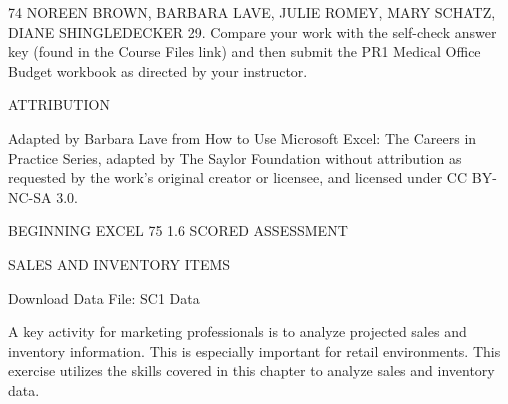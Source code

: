 74 NOREEN BROWN, BARBARA LAVE, JULIE ROMEY, MARY SCHATZ, DIANE SHINGLEDECKER
29. Compare your work with the self-check answer key (found in the Course Files link) and then
submit the PR1 Medical Office Budget workbook as directed by your instructor.

ATTRIBUTION

Adapted by Barbara Lave from How to Use Microsoft Excel: The Careers in Practice Series, adapted
by The Saylor Foundation without attribution as requested by the work’s original creator or
licensee, and licensed under CC BY-NC-SA 3.0.




BEGINNING EXCEL 75
1.6 SCORED ASSESSMENT




SALES AND INVENTORY ITEMS

Download Data File: SC1 Data

A key activity for marketing professionals is to analyze projected sales and inventory information.
This is especially important for retail environments. This exercise utilizes the skills covered in this
chapter to analyze sales and inventory data.

